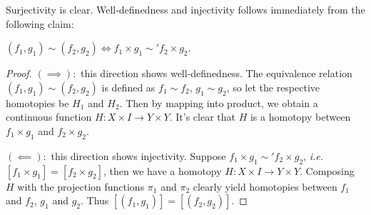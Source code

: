 \documentclass[12pt]{article}
\begin{document}
Surjectivity is clear. Well-definedness and injectivity follows immediately from the following claim:

\begin{claim}
$ (f_1,g_1) \sim (f_2,g_2) \iff f_1\times g_1 \sim' f_2 \times g_2$.
\end{claim}
\begin{proof}
$ (\implies):$ this direction shows well-definedness. The equivalence relation $(f_1,g_1) \sim (f_2,g_2)$ is defined as $ f_1 \sim f_2$, $g_1 \sim g_2$, so let the respective homotopies be $ H_1$ and $ H_2$. Then by mapping into product, we obtain a continuous function $ H: X \times I \to Y \times Y$. It's clear that $ H$ is a homotopy between  $ f_1 \times g_1 $ and $ f_2 \times g_2$.

$ (\impliedby):$ this direction shows injectivity. Suppose $ f_1 \times g_1 \sim' f_2 \times g_2$, \emph{i.e.}  $ [f_1 \times g_1] = [f_2 \times g_2]$, then we have a homotopy $ H: X \times I \to Y \times Y$. Composing $ H$ with the projection functions  $ \pi_1$ and $ \pi_2$ clearly yield homotopies between $ f_1$ and $ f_2$, $ g_1$ and $ g_2$. Thus $ [(f_1,g_1)] = [(f_2,g_2)]$.

\end{proof}
\end{document}
